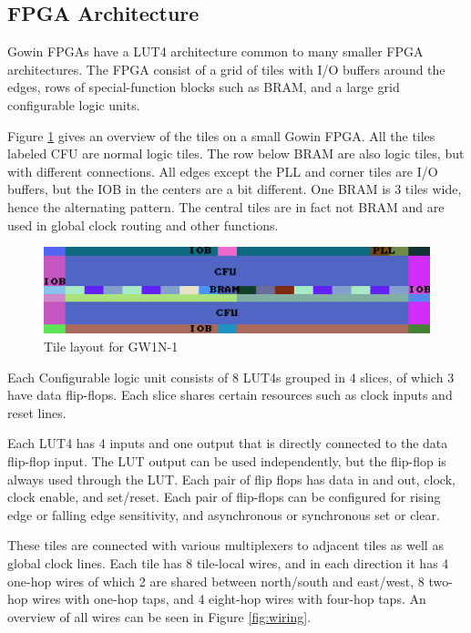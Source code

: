 \documentclass{article}
\begin{document}
\subsection{FPGA Architecture}

Gowin FPGAs have a LUT4 architecture common to many smaller FPGA architectures. The FPGA consist of a grid of tiles with I/O buffers around the edges, rows of special-function blocks such as BRAM, and a large grid configurable logic units.

Figure \ref{fig:tiles} gives an overview of the tiles on a small Gowin FPGA. All the tiles labeled CFU are normal logic tiles. The row below BRAM are also logic tiles, but with different connections. All edges except the PLL and corner tiles are I/O buffers, but the IOB in the centers are a bit different. One BRAM is 3 tiles wide, hence the alternating pattern. The central tiles are in fact not BRAM and are used in global clock routing and other functions.

\begin{figure}
    \centering
    \includegraphics[width=\textwidth]{fig/fuse.png}
    \caption{Tile layout for GW1N-1}
    \label{fig:tiles}
\end{figure}

Each Configurable logic unit consists of 8 LUT4s grouped in 4 slices, of which 3 have data flip-flops. Each slice shares certain resources such as clock inputs and reset lines.

Each LUT4 has 4 inputs and one output that is directly connected to the data flip-flop input. The LUT output can be used independently, but the flip-flop is always used through the LUT. Each pair of flip flops has data in and out, clock, clock enable, and set/reset. Each pair of flip-flops can be configured for rising edge or falling edge sensitivity, and asynchronous or synchronous set or clear.

These tiles are connected with various multiplexers to adjacent tiles as well as global clock lines. Each tile has 8 tile-local wires, and in each direction it has 4 one-hop wires of which 2 are shared between north/south and east/west, 8 two-hop wires with one-hop taps, and 4 eight-hop wires with four-hop taps. An overview of all wires can be seen in Figure \ref{fig:wiring}.
\end{document}
